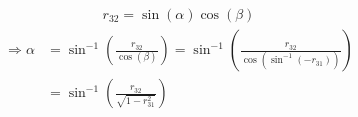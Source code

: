 \begin{equation*}
    r_{32} = \sin(\alpha)\cos(\beta)
\end{equation*}
\begin{align}
    \begin{split}
        \Rightarrow \alpha & = \sin^{-1}\left(\frac{r_{32}}{\cos(\beta)}\right)               = \sin^{-1}\left(\frac{r_{32}}{\cos(\sin^{-1}(-r_{31}))}\right) \\
        & = \sin^{-1}\left(\frac{r_{32}}{\sqrt{1-r_{31}^2}}\right)
    \end{split}
\end{align}
